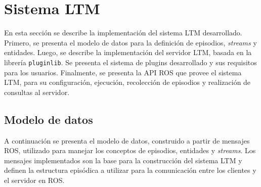 


\section{Sistema LTM}

En esta sección se describe la implementación del sistema LTM desarrollado. Primero, se presenta el modelo de datos para la definición de episodios, \textit{streams} y entidades. Luego, se describe la implementación del servidor LTM, basada en la librería \texttt{pluginlib}. Se presenta el sistema de plugins desarrollado y sus requisitos para los usuarios. Finalmente, se presenta la API ROS que provee el sistema LTM, para su configuración, ejecución, recolección de episodios y realización de consultas al servidor.


\subsection{Modelo de datos}

A continuación se presenta el modelo de datos, construido a partir de mensajes ROS, utilizado para manejar los conceptos de episodios, entidades y \textit{streams}. Los mensajes implementados son la base para la construcción del sistema LTM y definen la estructura episódica a utilizar para la comunicación entre los clientes y el servidor en ROS.

